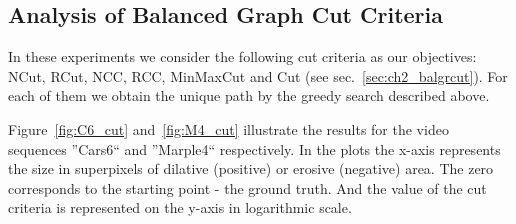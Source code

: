 \subsection{Analysis of Balanced Graph Cut Criteria}
In these experiments we consider the following cut criteria as our objectives: NCut, RCut, NCC, RCC, MinMaxCut and Cut (see sec.~\ref{sec:ch2_balgrcut}). For each of them we obtain the unique path by the greedy search described above.

Figure~\ref{fig:C6_cut} and~\ref{fig:M4_cut} illustrate the results for the video sequences ''Cars6`` and ''Marple4`` respectively. 
In the plots the x-axis represents the size in superpixels of dilative (positive) or erosive (negative) area. The zero corresponds to the starting point - the ground truth.
And the value of the cut criteria is represented on the y-axis in logarithmic scale.
